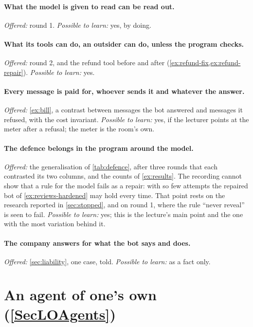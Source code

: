 \SecLOProduct*

\paragraph{What the model is given to read can be read out.}
\emph{Offered:} round 1.
\emph{Possible to learn:} yes, by doing.
\paragraph{What its tools can do, an outsider can do, unless the program
  checks.}
\emph{Offered:} round 2, and the refund tool before and after
(\cref{ex:refund-fix,ex:refund-repair}).
\emph{Possible to learn:} yes.
\paragraph{Every message is paid for, whoever sends it and whatever the
  answer.}
\emph{Offered:} \cref{ex:bill}, a contrast between messages the bot
answered and messages it refused, with the cost invariant.
\emph{Possible to learn:} yes, if the lecturer points at the meter
after a refusal; the meter is the room's own.
\paragraph{The defence belongs in the program around the model.}
\emph{Offered:} the generalisation of \cref{tab:defence}, after
three rounds that each contrasted its two columns, and the counts of
\cref{ex:results}.
The recording cannot show that a rule for the model fails as a repair:
with so few attempts the repaired bot of \cref{ex:reviews-hardened}
may hold every time.
That point rests on the research reported in \cref{sec:stopped}, and
on round 1, where the rule \enquote{never reveal} is seen to fail.
\emph{Possible to learn:} yes; this is the lecture's main point and
the one with the most variation behind it.
\paragraph{The company answers for what the bot says and does.}
\emph{Offered:} \cref{sec:liability}, one case, told.
\emph{Possible to learn:} as a fact only.


\section{An agent of one's own (\cref{SecLOAgents})}
\label{sec:design-agents}

